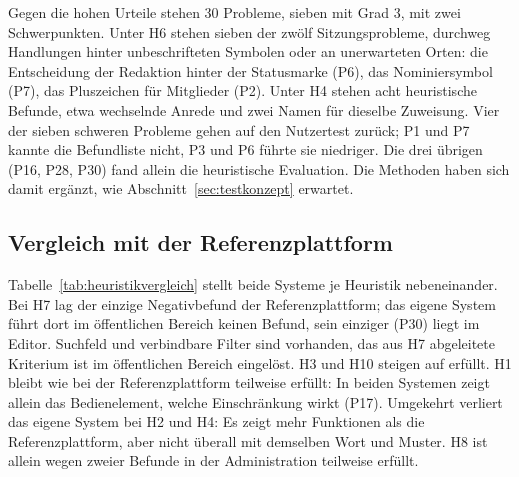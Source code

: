 Gegen die hohen Urteile stehen 30 Probleme, sieben mit Grad 3, mit zwei Schwerpunkten. Unter H6 stehen sieben der zwölf Sitzungsprobleme, durchweg Handlungen hinter unbeschrifteten Symbolen oder an unerwarteten Orten: die Entscheidung der Redaktion hinter der Statusmarke (P6), das Nominiersymbol (P7), das Pluszeichen für Mitglieder (P2). Unter H4 stehen acht heuristische Befunde, etwa wechselnde Anrede und zwei Namen für dieselbe Zuweisung. Vier der sieben schweren Probleme gehen auf den Nutzertest zurück; P1 und P7 kannte die Befundliste nicht, P3 und P6 führte sie niedriger. Die drei übrigen (P16, P28, P30) fand allein die heuristische Evaluation. Die Methoden haben sich damit ergänzt, wie Abschnitt~\ref{sec:testkonzept} erwartet.

\subsection{Vergleich mit der Referenzplattform}
\label{subsec:vergleich}

Tabelle~\ref{tab:heuristikvergleich} stellt beide Systeme je Heuristik nebeneinander. Bei H7 lag der einzige Negativbefund der Referenzplattform; das eigene System führt dort im öffentlichen Bereich keinen Befund, sein einziger (P30) liegt im Editor. Suchfeld und verbindbare Filter sind vorhanden, das aus H7 abgeleitete Kriterium ist im öffentlichen Bereich eingelöst. H3 und H10 steigen auf erfüllt. H1 bleibt wie bei der Referenzplattform teilweise erfüllt: In beiden Systemen zeigt allein das Bedienelement, welche Einschränkung wirkt (P17). Umgekehrt verliert das eigene System bei H2 und H4: Es zeigt mehr Funktionen als die Referenzplattform, aber nicht überall mit demselben Wort und Muster. H8 ist allein wegen zweier Befunde in der Administration teilweise erfüllt.

